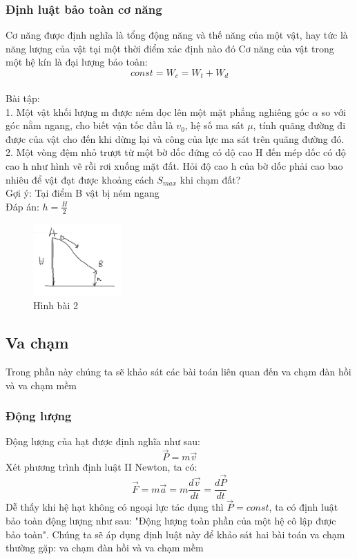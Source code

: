 \subsubsection{Định luật bảo toàn cơ năng}
Cơ năng được định nghĩa là tổng động năng và thế năng của một vật, hay tức là năng lượng của vật tại một thời điểm xác định nào đó
Cơ năng của vật trong một hệ kín là đại lượng bảo toàn:
$$const=W_{c}=W_{t}+W_{d}$$
\\Bài tập: 
\\1. Một vật khối lượng m được ném dọc lên một mặt phẳng nghiêng góc $\alpha$ so với góc nằm ngang, cho biết vận tốc đầu là $v_{0}$, hệ số ma sát $\mu$, tính quãng đường đi được của vật cho đến khi dừng lại và công của lực ma sát trên quãng đường đó.
\\2. Một vòng đệm nhỏ trượt từ một bờ dốc đứng có dộ cao H đến mép dốc có độ cao h như hình vẽ rồi rơi xuống mặt đất. Hỏi độ cao h của bờ dốc phải cao bao nhiêu để vật đạt được khoảng cách $S_{max}$ khi chạm đất?
\\Gợi ý: Tại điểm B vật bị ném ngang
\\Đáp án: $h=\frac{H}{2}$
\begin{figure}
    \centering
    \includegraphics[width=0.3\textwidth]{vat.png}
    \caption{Hình bài 2}
    \label{vat}
\end{figure}
\subsection{Va chạm}
Trong phần này chúng ta sẽ khảo sát các bài toán liên quan đến va chạm đàn hồi và va chạm mềm
\subsubsection{Động lượng}
Động lượng của hạt được định nghĩa như sau: $$\vec{P}=m\vec{v}$$
Xét phương trình định luật II Newton, ta có:
$$\vec{F}=m\vec{a}=m\frac{d\vec{v}}{dt}=\frac{d \vec{P}}{dt}$$
Dễ thấy khi hệ hạt không có ngoại lực tác dụng thì $\vec{P}=const$, ta có định luật bảo toàn động lượng như sau: "Động lượng toàn phần của một hệ cô lập được bảo toàn". Chúng ta sẽ áp dụng định luật này để khảo sát hai bài toán va chạm thường gặp: va chạm đàn hồi và va chạm mềm
